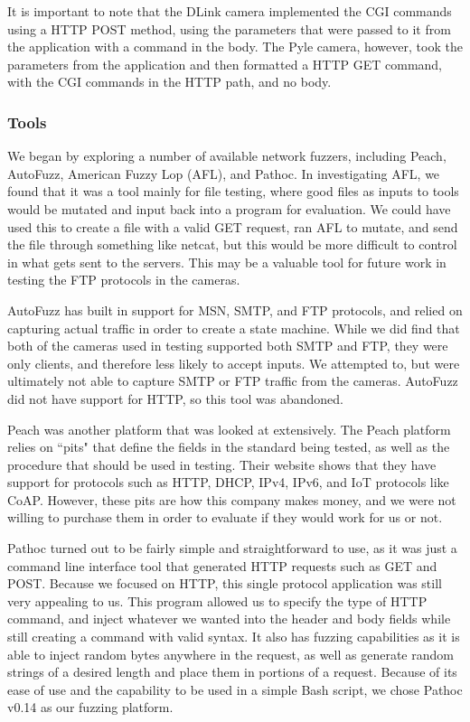 \documentclass[letterpaper,twocolumn,10pt]{article}
\begin{document}
It is important to note that the DLink camera implemented the CGI commands using a HTTP POST method, using the parameters that were passed to it from the application with a command in the body. The Pyle camera, however, took the parameters from the application and then formatted a HTTP GET command, with the CGI commands in the HTTP path, and no body.


\subsubsection{Tools}
We began by exploring a number of available network fuzzers, including Peach, AutoFuzz, American Fuzzy Lop (AFL), and Pathoc. In investigating AFL, we found that it was a tool mainly for file testing, where good files as inputs to tools would be mutated and input back into a program for evaluation. We could have used this to create a file with a valid GET request, ran AFL to mutate, and send the file through something like netcat, but this would be more difficult to control in what gets sent to the servers. This may be a valuable tool for future work in testing the FTP protocols in the cameras.

AutoFuzz has built in support for MSN, SMTP, and FTP protocols, and relied on capturing actual traffic in order to create a state machine. While we did find that both of the cameras used in testing supported both SMTP and FTP, they were only clients, and therefore less likely to accept inputs. We attempted to, but were ultimately not able to capture SMTP or FTP traffic from the cameras. AutoFuzz did not have support for HTTP, so this tool was abandoned.

Peach was another platform that was looked at extensively. The Peach platform relies on ``pits" that define the fields in the standard being tested, as well as the procedure that should be used in testing. Their website shows that they have support for protocols such as HTTP, DHCP, IPv4, IPv6, and IoT protocols like CoAP. However, these pits are how this company makes money, and we were not willing to purchase them in order to evaluate if they would work for us or not.

Pathoc turned out to be fairly simple and straightforward to use, as it was just a command line interface tool that generated HTTP requests such as GET and POST. Because we focused on HTTP, this single protocol application was still very appealing to us. This program allowed us to specify the type of HTTP command, and inject whatever we wanted into the header and body fields while still creating a command with valid syntax. It also has fuzzing capabilities as it is able to inject random bytes anywhere in the request, as well as generate random strings of a desired length and place them in portions of a request. Because of its ease of use and the capability to be used in a simple Bash script, we chose Pathoc v0.14 as our fuzzing platform.
\end{document}
